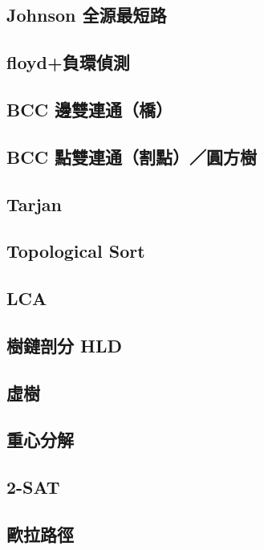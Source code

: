 \subsection{Johnson 全源最短路}

\subsection{floyd+負環偵測}

\subsection{BCC 邊雙連通（橋）}

\subsection{BCC 點雙連通（割點）／圓方樹}

\subsection{Tarjan}

\subsection{Topological Sort}

\subsection{LCA}

\subsection{樹鏈剖分 HLD}

\subsection{虛樹}

\subsection{重心分解}

\subsection{2-SAT}

\subsection{歐拉路徑}

